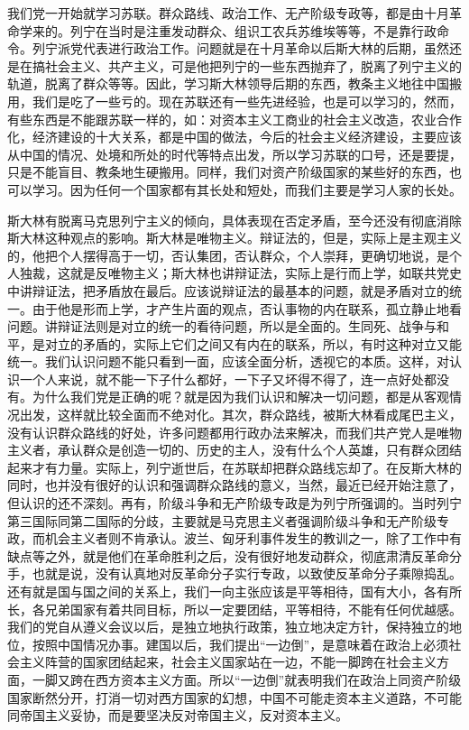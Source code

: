 我们党一开始就学习苏联。群众路线、政治工作、无产阶级专政等，都是由十月革命学来的。列宁在当时是注重发动群众、组识工农兵苏维埃等等，不是靠行政命令。列宁派党代表进行政治工作。问题就是在十月革命以后斯大林的后期，虽然还是在搞社会主义、共产主义，可是他把列宁的一些东西抛弃了，脱离了列宁主义的轨道，脱离了群众等等。因此，学习斯大林领导后期的东西，教条主义地往中国搬用，我们是吃了一些亏的。现在苏联还有一些先进经验，也是可以学习的，然而，有些东西是不能跟苏联一样的，如：对资本主义工商业的社会主义改造，农业合作化，经济建设的十大关系，都是中国的做法，今后的社会主义经济建设，主要应该从中国的情况、处境和所处的时代等特点出发，所以学习苏联的口号，还是要提，只是不能盲目、教条地生硬搬用。同样，我们对资产阶级国家的某些好的东西，也可以学习。因为任何一个国家都有其长处和短处，而我们主要是学习人家的长处。

斯大林有脱离马克思列宁主义的倾向，具体表现在否定矛盾，至今还没有彻底消除斯大林这种观点的影响。斯大林是唯物主义。辩证法的，但是，实际上是主观主义的，他把个人摆得高于一切，否认集团，否认群众，个人崇拜，更确切地说，是个人独裁，这就是反唯物主义；斯大林也讲辩证法，实际上是行而上学，如联共党史中讲辩证法，把矛盾放在最后。应该说辩证法的最基本的问题，就是矛盾对立的统一。由于他是形而上学，才产生片面的观点，否认事物的内在联系，孤立静止地看问题。讲辩证法则是对立的统一的看待问题，所以是全面的。生同死、战争与和平，是对立的矛盾的，实际上它们之间又有内在的联系，所以，有时这种对立又能统一。我们认识问题不能只看到一面，应该全面分析，透视它的本质。这样，对认识一个人来说，就不能一下子什么都好，一下子又坏得不得了，连一点好处都没有。为什么我们党是正确的呢？就是因为我们认识和解决一切问题，都是从客观情况出发，这样就比较全面而不绝对化。其次，群众路线，被斯大林看成尾巴主义，没有认识群众路线的好处，许多问题都用行政办法来解决，而我们共产党人是唯物主义者，承认群众是创造一切的、历史的主人，没有什么个人英雄，只有群众团结起来才有力量。实际上，列宁逝世后，在苏联却把群众路线忘却了。在反斯大林的同时，也并没有很好的认识和强调群众路线的意义，当然，最近已经开始注意了，但认识的还不深刻。再有，阶级斗争和无产阶级专政是为列宁所强调的。当时列宁第三国际同第二国际的分歧，主要就是马克思主义者强调阶级斗争和无产阶级专政，而机会主义者则不肯承认。波兰、匈牙利事件发生的教训之一，除了工作中有缺点等之外，就是他们在革命胜利之后，没有很好地发动群众，彻底肃清反革命分手，也就是说，没有认真地对反革命分子实行专政，以致使反革命分子乘隙捣乱。还有就是国与国之间的关系上，我们一向主张应该是平等相待，国有大小，各有所长，各兄弟国家有着共同目标，所以一定要团结，平等相待，不能有任何优越感。我们的党自从遵义会议以后，是独立地执行政策，独立地决定方针，保持独立的地位，按照中国情况办事。建国以后，我们提出“一边倒”，是意味着在政治上必须社会主义阵营的国家团结起来，社会主义国家站在一边，不能一脚跨在社会主义方面，一脚又跨在西方资本主义方面。所以“一边倒”就表明我们在政治上同资产阶级国家断然分开，打消一切对西方国家的幻想，中国不可能走资本主义道路，不可能同帝国主义妥协，而是要坚决反对帝国主义，反对资本主义。

